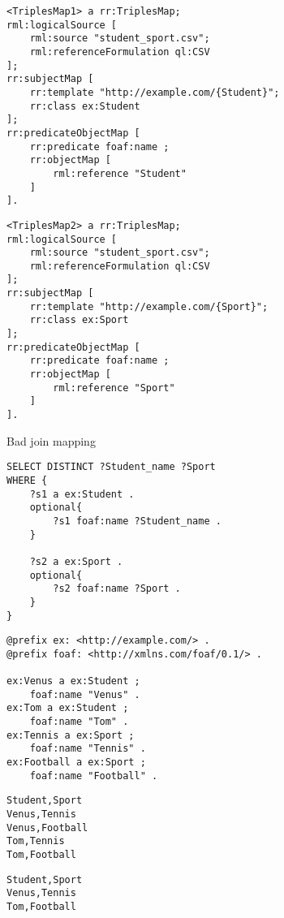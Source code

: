 \begin{listing}
    \noindent\begin{minipage}[b]{.45\textwidth}
        \begin{lstlisting}[basicstyle=\small]
<TriplesMap1> a rr:TriplesMap;
rml:logicalSource [ 
    rml:source "student_sport.csv";
    rml:referenceFormulation ql:CSV
];
rr:subjectMap [ 
    rr:template "http://example.com/{Student}";
    rr:class ex:Student
];
rr:predicateObjectMap [ 
    rr:predicate foaf:name ; 
    rr:objectMap [ 
        rml:reference "Student"
    ]
].
        \end{lstlisting}      
    \end{minipage}
    \hfill
    \begin{minipage}[b]{.45\textwidth}
        \begin{lstlisting}[basicstyle=\small]
<TriplesMap2> a rr:TriplesMap;
rml:logicalSource [ 
    rml:source "student_sport.csv";
    rml:referenceFormulation ql:CSV
];
rr:subjectMap [ 
    rr:template "http://example.com/{Sport}";
    rr:class ex:Sport
];
rr:predicateObjectMap [ 
    rr:predicate foaf:name ; 
    rr:objectMap [ 
        rml:reference "Sport"
    ]
].
        \end{lstlisting}
    \end{minipage}
    \addtocounter{listing}{5}
    \caption{Bad join mapping}
    \label{lst:bad_join_example}
\end{listing}

\begin{lstlisting}[caption={Bad join query (trimmed)}, label={lst:bad_join_query}, captionpos=b, basicstyle=\small]
SELECT DISTINCT ?Student_name ?Sport
WHERE {
    ?s1 a ex:Student .
    optional{
        ?s1 foaf:name ?Student_name .
    }

    ?s2 a ex:Sport .
    optional{
        ?s2 foaf:name ?Sport .
    }
}
\end{lstlisting}

\begin{lstlisting}[caption={Bad join knowledge graph}, label={lst:bad_join_kg}, captionpos=b, basicstyle=\small]
@prefix ex: <http://example.com/> .
@prefix foaf: <http://xmlns.com/foaf/0.1/> .

ex:Venus a ex:Student ;
    foaf:name "Venus" .
ex:Tom a ex:Student ;
    foaf:name "Tom" .
ex:Tennis a ex:Sport ;
    foaf:name "Tennis" .
ex:Football a ex:Sport ;
    foaf:name "Football" .
\end{lstlisting}

\begin{lstlisting}[caption={Bad join result}, label={lst:bad_join_result}, captionpos=b, basicstyle=\small]
Student,Sport
Venus,Tennis
Venus,Football
Tom,Tennis
Tom,Football
\end{lstlisting}

\begin{lstlisting}[caption={Bad join original source}, label={lst:bad_join_expected_result}, captionpos=b]
Student,Sport
Venus,Tennis
Tom,Football
\end{lstlisting}
